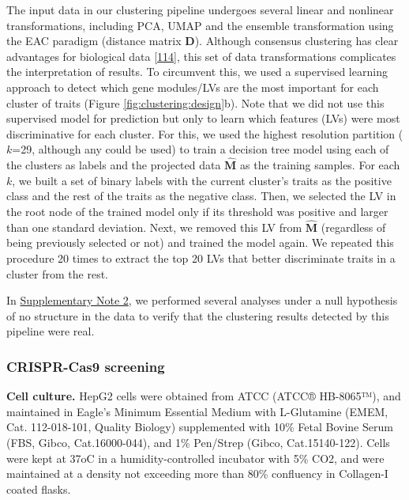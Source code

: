 \documentclass[
]{article}
\begin{document}
The input data in our clustering pipeline undergoes several linear and nonlinear transformations, including PCA, UMAP and the ensemble transformation using the EAC paradigm (distance matrix \(\mathbf{D}\)).
Although consensus clustering has clear advantages for biological data {[}\protect\hyperlink{ref-S7LBsfcF}{114}{]}, this set of data transformations complicates the interpretation of results.
To circumvent this, we used a supervised learning approach to detect which gene modules/LVs are the most important for each cluster of traits (Figure \ref{fig:clustering:design}b).
Note that we did not use this supervised model for prediction but only to learn which features (LVs) were most discriminative for each cluster.
For this, we used the highest resolution partition (\(k\)=29, although any could be used) to train a decision tree model using each of the clusters as labels and the projected data \(\hat{\mathbf{M}}\) as the training samples.
For each \(k\), we built a set of binary labels with the current cluster's traits as the positive class and the rest of the traits as the negative class.
Then, we selected the LV in the root node of the trained model only if its threshold was positive and larger than one standard deviation.
Next, we removed this LV from \(\hat{\mathbf{M}}\) (regardless of being previously selected or not) and trained the model again.
We repeated this procedure 20 times to extract the top 20 LVs that better discriminate traits in a cluster from the rest.

In \protect\hyperlink{sm:clustering:null_sim}{Supplementary Note 2}, we performed several analyses under a null hypothesis of no structure in the data to verify that the clustering results detected by this pipeline were real.

\hypertarget{sec:methods:crispr}{%
\subsubsection{CRISPR-Cas9 screening}\label{sec:methods:crispr}}

\textbf{Cell culture.}
HepG2 cells were obtained from ATCC (ATCC® HB-8065™), and maintained in Eagle's Minimum Essential Medium with L-Glutamine (EMEM, Cat. 112-018-101, Quality Biology) supplemented with 10\% Fetal Bovine Serum (FBS, Gibco, Cat.16000-044), and 1\% Pen/Strep (Gibco, Cat.15140-122).
Cells were kept at 37oC in a humidity-controlled incubator with 5\% CO2, and were maintained at a density not exceeding more than 80\% confluency in Collagen-I coated flasks.
\end{document}
